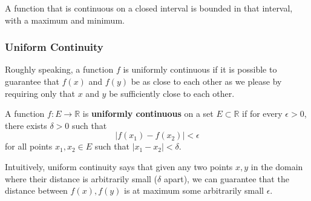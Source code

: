 \documentclass{article}
\begin{document}
    \begin{theorem}
    A function that is continuous on a closed interval is bounded in that interval, with a maximum and minimum. 
    \end{theorem}

    \subsubsection{Uniform Continuity}
    Roughly speaking, a function $f$ is uniformly continuous if it is possible to guarantee that $f(x)$ and $f(y)$ be as close to each other as we please by requiring only that $x$ and $y$ be sufficiently close to each other. 

    \begin{definition}
      A function $f: E \longrightarrow \mathbb{R}$ is \textbf{uniformly continuous} on a set $E \subset \mathbb{R}$ if for every $\epsilon > 0$, there exists $\delta > 0$ such that 
      \[\big| f(x_1) - f(x_2)\big| < \epsilon\]
      for all points $x_1, x_2 \in E$ such that $|x_1 - x_2| < \delta$. 

      Intuitively, uniform continuity says that given any two points $x, y$ in the domain where their distance is arbitrarily small ($\delta$ apart), we can guarantee that the distance between $f(x), f(y)$ is at maximum some arbitrarily small $\epsilon$. 


\end{definition}
\end{document}
